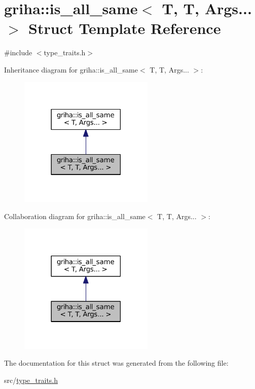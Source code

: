 \hypertarget{structgriha_1_1is__all__same_3_01_t_00_01_t_00_01_args_8_8_8_01_4}{}\section{griha\+:\+:is\+\_\+all\+\_\+same$<$ T, T, Args... $>$ Struct Template Reference}
\label{structgriha_1_1is__all__same_3_01_t_00_01_t_00_01_args_8_8_8_01_4}


{\ttfamily \#include $<$type\+\_\+traits.\+h$>$}



Inheritance diagram for griha\+:\+:is\+\_\+all\+\_\+same$<$ T, T, Args... $>$\+:
\nopagebreak
\begin{figure}[H]
\begin{center}
\leavevmode
\includegraphics[width=182pt]{structgriha_1_1is__all__same_3_01_t_00_01_t_00_01_args_8_8_8_01_4__inherit__graph}
\end{center}
\end{figure}


Collaboration diagram for griha\+:\+:is\+\_\+all\+\_\+same$<$ T, T, Args... $>$\+:
\nopagebreak
\begin{figure}[H]
\begin{center}
\leavevmode
\includegraphics[width=182pt]{structgriha_1_1is__all__same_3_01_t_00_01_t_00_01_args_8_8_8_01_4__coll__graph}
\end{center}
\end{figure}


The documentation for this struct was generated from the following file\+:\begin{DoxyCompactItemize}
\item 
src/\hyperlink{type__traits_8h}{type\+\_\+traits.\+h}\end{DoxyCompactItemize}
